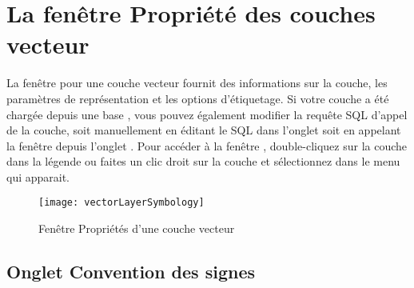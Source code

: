 \section{La fenêtre Propriété des couches vecteur}\label{sec:vectorprops}

La fenêtre  pour une couche vecteur fournit des informations sur la couche, les paramètres de représentation et les options d'étiquetage. Si votre couche a été chargée depuis une base \ppg, vous pouvez également modifier la requête SQL d'appel de la couche, soit manuellement en éditant le SQL dans l'onglet  soit en appelant la fenêtre  depuis l'onglet . Pour accéder à la fenêtre , double-cliquez sur la couche dans la légende ou faites un clic droit sur la couche et sélectionnez  dans le menu qui apparait.

\begin{figure}[ht]
  \begin{center}
  \texttt{[image: vectorLayerSymbology]}
  \caption{Fenêtre Propriétés d'une couche vecteur \nixcaption}\label{fig:vector_symbology}
\end{center}
\end{figure}

\subsection{Onglet Convention des signes}\label{sec:symbology}

